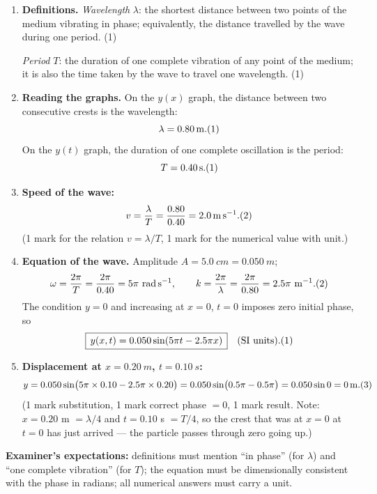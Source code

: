 \documentclass[11pt]{article}
\begin{document}
\begin{corrige}
\begin{enumerate}
\item \textbf{Definitions.} \emph{Wavelength} $\lambda$: the shortest distance between two points of the medium vibrating in phase; equivalently, the distance travelled by the wave during one period. \hfill (1)\par
\emph{Period} $T$: the duration of one complete vibration of any point of the medium; it is also the time taken by the wave to travel one wavelength. \hfill (1)
\item \textbf{Reading the graphs.} On the $y(x)$ graph, the distance between two consecutive crests is the wavelength:
\[ \lambda = \SI{0.80}{m}. \hfill (1) \]
On the $y(t)$ graph, the duration of one complete oscillation is the period:
\[ T = \SI{0.40}{s}. \hfill (1) \]
\item \textbf{Speed of the wave:}
\[ v = \frac{\lambda}{T} = \frac{0.80}{0.40} = \SI{2.0}{m.s^{-1}}. \hfill (2) \]
(1 mark for the relation $v = \lambda/T$, 1 mark for the numerical value with unit.)
\item \textbf{Equation of the wave.} Amplitude $A = \SI{5.0}{cm} = \SI{0.050}{m}$;
\[ \omega = \frac{2\pi}{T} = \frac{2\pi}{0.40} = 5\pi\ \mathrm{rad\,s^{-1}}, \qquad
k = \frac{2\pi}{\lambda} = \frac{2\pi}{0.80} = 2.5\pi\ \mathrm{m^{-1}}. \hfill (2) \]
The condition $y = 0$ and increasing at $x = 0$, $t = 0$ imposes zero initial phase, so
\[ \boxed{\,y(x,t) = 0.050\sin(5\pi t - 2.5\pi x)\,} \quad (\text{SI units}). \hfill (1) \]
\item \textbf{Displacement at $x = \SI{0.20}{m}$, $t = \SI{0.10}{s}$:}
\[ y = 0.050\sin\!\big(5\pi\times 0.10 - 2.5\pi\times 0.20\big)
= 0.050\sin\!\big(0.5\pi - 0.5\pi\big) = 0.050\sin 0 = \SI{0}{m}. \hfill (3) \]
(1 mark substitution, 1 mark correct phase $= 0$, 1 mark result. Note: $x = 0.20$ m $= \lambda/4$ and $t = 0.10$ s $= T/4$, so the crest that was at $x=0$ at $t=0$ has just arrived --- the particle passes through zero going up.)
\end{enumerate}
\textbf{Examiner's expectations:} definitions must mention ``in phase'' (for $\lambda$) and ``one complete vibration'' (for $T$); the equation must be dimensionally consistent with the phase in radians; all numerical answers must carry a unit.
\end{corrige}
\end{document}
